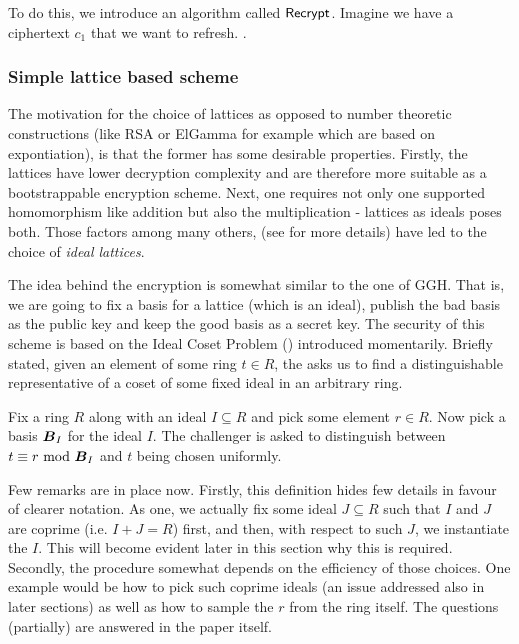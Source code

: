 To do this, we introduce an algorithm called $\alg{Recrypt}$. Imagine we have a ciphertext $c_1$ that we want to refresh. .

\subsubsection{Simple lattice based scheme}
The motivation for the choice of lattices as opposed to number theoretic constructions (like RSA or ElGamma for example which are based on expontiation), is that the former has some desirable properties. Firstly, the lattices have lower decryption complexity and are therefore more suitable as a bootstrappable encryption scheme. Next, one requires not only one supported homomorphism like addition but also the multiplication - lattices as ideals poses both. Those factors among many others, (see \cite{gentry} for more details) have led to the choice of \textit{ideal lattices}.

The idea behind the encryption is somewhat similar to the one of GGH. That is, we are going to fix a basis for a lattice (which is an ideal), publish the bad basis as the public key and keep the good basis as a secret key. The security of this scheme is based on the Ideal Coset Problem () introduced momentarily. Briefly stated, given an element of some ring $t \in R$, the  asks us to find a distinguishable representative of a coset of some fixed ideal in an arbitrary ring.

\begin{definition}[Informal]
  Fix a ring $R$ along with an ideal $I \subseteq R$ and pick some element $r \in R$. Now pick a basis $\B_I$ for the ideal $I$. The challenger is asked to distinguish between $t \equiv r \mod \B_I$ and $t$ being chosen uniformly.
\end{definition}
Few remarks are in place now. Firstly, this definition hides few details in favour of clearer notation. As one, we actually fix some ideal $J \subseteq R$ such that $I$ and $J$ are coprime (i.e. $I + J = R$) first, and then, with respect to such $J$, we instantiate the $I$. This will become evident later in this section why this is required. Secondly, the procedure somewhat depends on the efficiency of those choices. One example would be how to pick such coprime ideals (an issue addressed also in later sections) as well as how to sample the $r$ from the ring itself. The questions (partially) are answered in the paper \cite{gentry_phd} itself.

